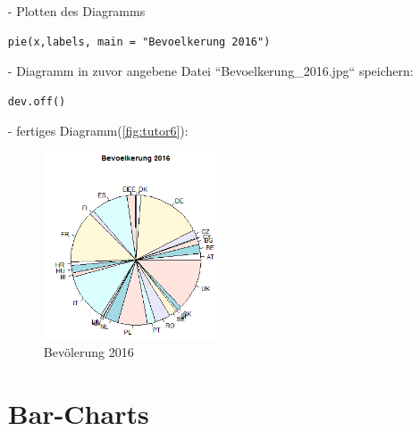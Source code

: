 \begin{itemize}
\begin{lstlisting}
\end{lstlisting}
\item[-]Plotten des Diagramms
\begin{lstlisting}
pie(x,labels, main = "Bevoelkerung 2016")
\end{lstlisting}
\item[-]Diagramm in zuvor angebene Datei ``Bevoelkerung\_2016.jpg`` speichern:
\begin{lstlisting}
dev.off()
\end{lstlisting}
\item[-]fertiges Diagramm(\autoref{fig:tutor6}):
\begin{figure}[!htb]
        \begin{minipage}{1\textwidth}
                \centering
                \includegraphics[width=0.50\textwidth]{pics/tutor6.png}\par\vspace{0cm}
                \caption{Bevölerung 2016}
                \label{fig:tutor6}
        \end{minipage}
\end{figure}

\section*{Bar-Charts}

\end{itemize}

